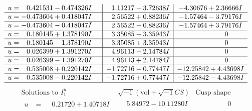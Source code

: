 \documentclass[1p]{elsarticle_modified}
\theoremstyle{definition}
\newcommand{\I}{\sqrt{-1}}
\begin{document}
$$\begin{array}{c|c|c}
\begin{aligned}
u &= \phantom{-}0.421531 - 0.474326 I\end{aligned}
 & \phantom{-}1.11217 - 3.72638 I & -4.30676 + 2.36666 I \\ \hline\begin{aligned}
u &= -0.473604 + 0.418047 I\end{aligned}
 & \phantom{-}2.56522 + 0.88236 I & -1.57464 - 3.79176 I \\ \hline\begin{aligned}
u &= -0.473604 - 0.418047 I\end{aligned}
 & \phantom{-}2.56522 - 0.88236 I & -1.57464 + 3.79176 I \\ \hline\begin{aligned}
u &= \phantom{-}0.180145 + 1.378190 I\end{aligned}
 & \phantom{-}3.35085 - 3.35943 I & \phantom{-0.000000 } 0 \\ \hline\begin{aligned}
u &= \phantom{-}0.180145 - 1.378190 I\end{aligned}
 & \phantom{-}3.35085 + 3.35943 I & \phantom{-0.000000 } 0 \\ \hline\begin{aligned}
u &= \phantom{-}0.026399 + 1.391270 I\end{aligned}
 & \phantom{-}4.96113 - 2.14784 I & \phantom{-0.000000 } 0 \\ \hline\begin{aligned}
u &= \phantom{-}0.026399 - 1.391270 I\end{aligned}
 & \phantom{-}4.96113 + 2.14784 I & \phantom{-0.000000 } 0 \\ \hline\begin{aligned}
u &= \phantom{-}0.535008 + 0.220142 I\end{aligned}
 & -1.72716 - 0.77447 I & -12.25842 + 4.43698 I \\ \hline\begin{aligned}
u &= \phantom{-}0.535008 - 0.220142 I\end{aligned}
 & -1.72716 + 0.77447 I & -12.25842 - 4.43698 I\\
 \hline 
 \end{array}$$\newpage$$\begin{array}{c|c|c}  
\text{Solutions to }I^u_{1}& \I (\text{vol} + \sqrt{-1}CS) & \text{Cusp shape}\\
 \hline 
\begin{aligned}
u &= \phantom{-}0.21720 + 1.40718 I\end{aligned}
 & \phantom{-}5.84972 - 10.11280 I & \phantom{-0.000000 } 0 \\ \hline\begin{aligned}

\end{aligned}
\end{array}$$
\end{document}
